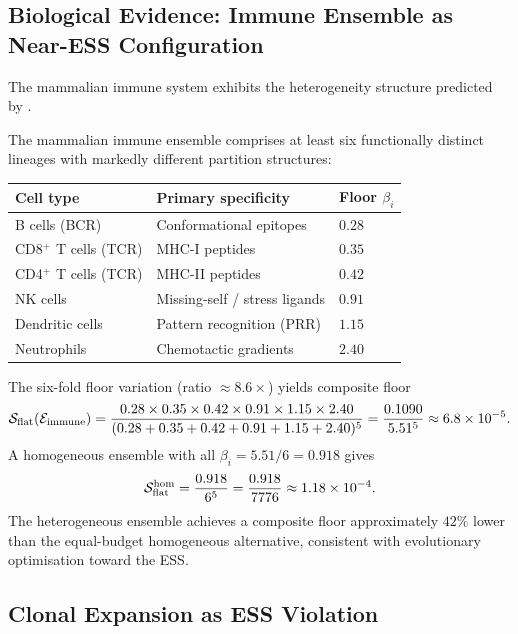\subsection{Biological Evidence: Immune Ensemble as Near-ESS Configuration}

The mammalian immune system exhibits the heterogeneity structure predicted by
.

\begin{example}
\label{ex:ch02b-immune-ess}
The mammalian immune ensemble comprises at least six functionally distinct
lineages with markedly different partition structures:
\begin{center}
\begin{tabular}{@{}lll@{}}
\toprule
Cell type & Primary specificity & Floor $\beta_i$ \\
\midrule
B cells (BCR)          & Conformational epitopes       & $0.28$ \\
CD8$^+$ T cells (TCR)  & MHC-I peptides                & $0.35$ \\
CD4$^+$ T cells (TCR)  & MHC-II peptides               & $0.42$ \\
NK cells               & Missing-self / stress ligands & $0.91$ \\
Dendritic cells        & Pattern recognition (PRR)     & $1.15$ \\
Neutrophils            & Chemotactic gradients          & $2.40$ \\
\bottomrule
\end{tabular}
\end{center}
The six-fold floor variation (ratio $\approx 8.6\times$) yields composite floor
\[
  \mathcal{S}_{\mathrm{flat}}(\mathcal{E}_{\mathrm{immune}})
  = \frac{0.28 \times 0.35 \times 0.42 \times 0.91 \times 1.15 \times 2.40}
         {(0.28+0.35+0.42+0.91+1.15+2.40)^{5}}
  = \frac{0.1090}{5.51^5}
  \approx 6.8 \times 10^{-5}.
\]
A homogeneous ensemble with all $\beta_i = 5.51/6 = 0.918$ gives
\[
  \mathcal{S}_{\mathrm{flat}}^{\mathrm{hom}}
  = \frac{0.918}{6^{5}}
  = \frac{0.918}{7776}
  \approx 1.18 \times 10^{-4}.
\]
The heterogeneous ensemble achieves a composite floor approximately $42\%$
lower than the equal-budget homogeneous alternative, consistent with
evolutionary optimisation toward the ESS.
\end{example}

\subsection{Clonal Expansion as ESS Violation}

